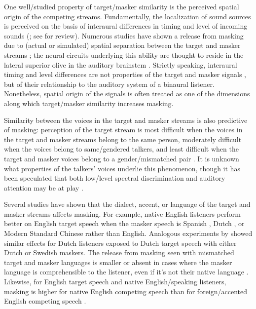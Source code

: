 One well\-/studied property of target\-/masker similarity is the perceived spatial origin of the competing streams.  Fundamentally, the localization of sound sources is perceived on the basis of interaural differences in timing and level of incoming sounds (\citealp[\eg,][]{Hirsh1950, Kock1950}; see \citealp{Darwin2008} for review).  Numerous studies have shown a release from masking due to (actual or simulated) spatial separation between the target and masker streams \citep[\eg,][]{CarhartEtAl1968, FreymanEtAl1999, BrungartSimpson2002, FreymanEtAl2004, GallunEtAl2005, KiddEtAl2005a, JohnstoneLitovsky2006}; the neural circuits underlying this ability are thought to reside in the lateral superior olive in the auditory brainstem \citep{ParkEtAl2004, TollinYin2005}.  Strictly speaking, interaural timing and level differences are not properties of the target and masker signals \perse, but of their relationship to the auditory system of a binaural listener.  Nonetheless, spatial origin of the signals is often treated as one of the dimensions along which target\-/masker similarity increases masking.   %

Similarity between the voices in the target and masker streams is also predictive of masking: perception of the target stream is most difficult when the voices in the target and masker streams belong to the same person, moderately difficult when the voices belong to same\-/gendered talkers, and least difficult when the target and masker voices belong to a gender\-/mismatched pair \citet{Brungart2001}.  It is unknown what properties of the talkers’ voices underlie this phenomenon, though it has been speculated that both low\-/level spectral discrimination and auditory attention may be at play \citep{HelferFreyman2008}.

Several studies have shown that the dialect, accent, or language of the target and masker streams affects masking.  For example, native English listeners perform better on English target speech when the masker speech is Spanish \citep{GarciaLecumberriCooke2006}, Dutch \citep{BrouwerEtAl2012}, or Modern Standard Chinese \citep{VanEngenBradlow2007} rather than English.  Analogous experiments by \citet{RhebergenEtAl2005} showed similar effects for Dutch listeners exposed to Dutch target speech with either Dutch or Swedish maskers.  The release from masking seen with mismatched target and masker languages is smaller or absent in cases where the masker language is comprehensible to the listener, even if it’s not their native language \citep{GarciaLecumberriCooke2006, VanEngen2010, BrouwerEtAl2012}.  Likewise, for English target speech and native English\-/speaking listeners, masking is higher for native English competing speech than for foreign\-/accented English competing speech \citep{CalandruccioEtAl2010}.\footnotemark{}

